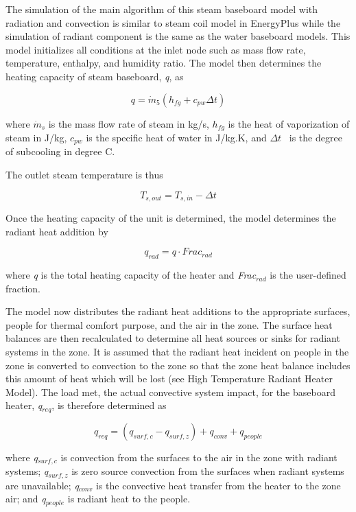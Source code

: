 The simulation of the main algorithm of this steam baseboard model with radiation and convection is similar to steam coil model in EnergyPlus while the simulation of radiant component is the same as the water baseboard models. This model initializes all conditions at the inlet node such as mass flow rate, temperature, enthalpy, and humidity ratio. The model then determines the heating capacity of steam baseboard, \emph{q}, as

\begin{equation}
q = {\dot m_5}({h_{fg}} + {c_{pw}}\Delta t)
\end{equation}

where \({\dot m_s}\) is the mass flow rate of steam in kg/s, \({h_{fg}}\) is the heat of vaporization of steam in J/kg, \({c_{pw}}\) is the specific heat of water in J/kg.K, and \(\Delta t\) ~is the degree of subcooling in degree C.

The outlet steam temperature is thus

\begin{equation}
{T_{s,out}} = {T_{s,in}} - \Delta t
\end{equation}

Once the heating capacity of the unit is determined, the model determines the radiant heat addition by

\begin{equation}
{q_{rad}} = q \cdot Fra{c_{rad}}
\end{equation}

where \emph{q} is the total heating capacity of the heater and \emph{Frac\(_{rad}\)} is the user-defined fraction.

The model now distributes the radiant heat additions to the appropriate surfaces, people for thermal comfort purpose, and the air in the zone. The surface heat balances are then recalculated to determine all heat sources or sinks for radiant systems in the zone. It is assumed that the radiant heat incident on people in the zone is converted to convection to the zone so that the zone heat balance includes this amount of heat which will be lost (see High Temperature Radiant Heater Model). The load met, the actual convective system impact, for the baseboard heater, \emph{q\(_{req}\)}, is therefore determined as

\begin{equation}
{q_{req}} = ({q_{surf,c}} - {q_{surf,z}}) + {q_{conv}} + {q_{people}}
\end{equation}

where \emph{q\(_{surf,c}\)} is convection from the surfaces to the air in the zone with radiant systems; \emph{q\(_{surf,z}\)} is zero source convection from the surfaces when radiant systems are unavailable; \emph{q\(_{conv}\)} is the convective heat transfer from the heater to the zone air; and \emph{q\(_{people}\)} is radiant heat to the people.

